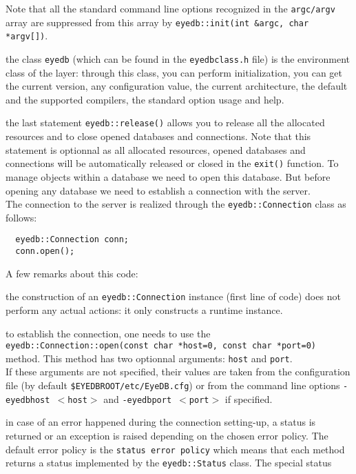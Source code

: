 \normalsize
Note that all the standard command line options recognized in the
\texttt{argc/argv} array are suppressed from this array by
\texttt{eyedb::init(int \&argc, char *argv[])}.
\item the class \texttt{eyedb} (which can be found in the \texttt{eyedbclass.h}
file) is the environment class of the \eyedb layer: through this class,
you can perform initialization, you can get the current \eyedb version,
any configuration value, the current architecture,
the default and the supported compilers, the standard option usage and help.
\item the last statement \texttt{eyedb::release()} allows you to release all
the \eyedb allocated resources and to close opened databases and connections.
Note that this statement is optionnal as all \eyedb allocated resources,
opened databases and connections will be automatically released or closed
in the \texttt{exit()} function.
\ee
{}
To manage objects within a database we need to open this database.
But before opening any database we need to establish a connection with
the \eyedb server.
\\
The connection to the \eyedb server is realized through the
\texttt{eyedb::Connection} class as follows:
\verbsize
\begin{verbatim}
  eyedb::Connection conn;
  conn.open();
\end{verbatim}
\normalsize
A few remarks about this code:
\be
\item the construction of an \texttt{eyedb::Connection} instance (first line of code)
does not perform any actual actions: it only constructs a runtime instance.
\item to establish the connection, one needs to use the
\texttt{eyedb::Connection::open(const char *host=0, const char *port=0)} method.
This method has two optionnal arguments: \texttt{host} and \texttt{port}.
\\
If these arguments are not specified, their values are taken from the
configuration file (by default \texttt{\$EYEDBROOT/etc/EyeDB.cfg}) or
from the command line options \texttt{-eyedbhost $<$host$>$} and
\texttt{-eyedbport $<$port$>$} if specified.
\item in case of an error happened during the connection setting-up,
a status is returned or an exception is raised depending on the
chosen error policy. The default error policy is the \texttt{status error
policy} which means that each \eyedb method returns a status
implemented by the \texttt{eyedb::Status} class. The special status
